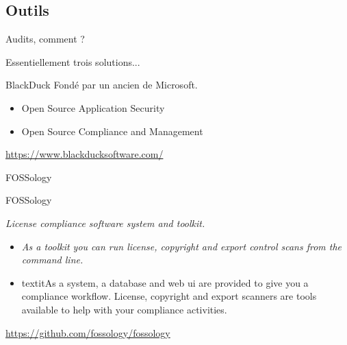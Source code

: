 \documentclass{beamer}
\begin{document}
\subsection{Outils}

\begin{frame}{Audits, comment ?}

Essentiellement trois solutions...

\end{frame}


\begin{frame}{BlackDuck}
  Fondé par un ancien de Microsoft.

  \begin{itemize}
  \item Open Source Application Security
  \item Open Source Compliance and Management
  \end{itemize}

\url{https://www.blackducksoftware.com/}
\end{frame}


\begin{frame}{FOSSology}
\begin{block}{FOSSology}

\textit{License compliance software system and toolkit.}
\end{block}

\begin{itemize}
\item \textit{As a toolkit you can run license, copyright and export control scans from the command line.}

\item textit{As a system, a database and web ui are provided to give you a compliance workflow. License, copyright and export scanners are tools available to help with your compliance activities.}
\end{itemize}

\url{https://github.com/fossology/fossology}
\end{frame}

\begin{frame}[plain]%
%  
\end{frame}
\end{document}
